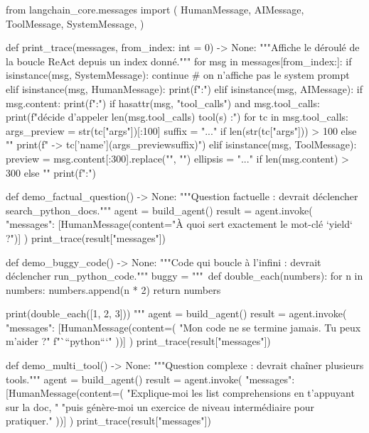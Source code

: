\documentclass[11pt,a4paper]{article}
\begin{document}
\begin{pythoncode}
from langchain_core.messages import (
    HumanMessage, AIMessage, ToolMessage, SystemMessage,
)


def print_trace(messages, from_index: int = 0) -> None:
    """Affiche le déroulé de la boucle ReAct depuis un index donné."""
    for msg in messages[from_index:]:
        if isinstance(msg, SystemMessage):
            continue   # on n'affiche pas le system prompt
        elif isinstance(msg, HumanMessage):
            print(f"\n[USER]:")
        elif isinstance(msg, AIMessage):
            if msg.content:
                print(f"\n[AI]:")
            if hasattr(msg, "tool_calls") and msg.tool_calls:
                print(f"\n[AI] décide d'appeler {len(msg.tool_calls)} tool(s) :")
                for tc in msg.tool_calls:
                    args_preview = str(tc["args"])[:100]
                    suffix = "..." if len(str(tc["args"])) > 100 else ""
                    print(f"   -> {tc['name']}({args_preview}{suffix})")
        elif isinstance(msg, ToolMessage):
            preview = msg.content[:300].replace("\n", "\n     ")
            ellipsis = "..." if len(msg.content) > 300 else ""
            print(f":")


def demo_factual_question() -> None:
    """Question factuelle : devrait déclencher search_python_docs."""
    agent = build_agent()
    result = agent.invoke({
        "messages": [HumanMessage(content="À quoi sert exactement le mot-clé `yield` ?")]
    })
    print_trace(result["messages"])


def demo_buggy_code() -> None:
    """Code qui boucle à l'infini : devrait déclencher run_python_code."""
    buggy = """\
def double_each(numbers):
    for n in numbers:
        numbers.append(n * 2)
    return numbers

print(double_each([1, 2, 3]))
"""
    agent = build_agent()
    result = agent.invoke({
        "messages": [HumanMessage(content=(
            "Mon code ne se termine jamais. Tu peux m'aider ?\n\n"
            f"```python\n{buggy}```"
        ))]
    })
    print_trace(result["messages"])


def demo_multi_tool() -> None:
    """Question complexe : devrait chaîner plusieurs tools."""
    agent = build_agent()
    result = agent.invoke({
        "messages": [HumanMessage(content=(
            "Explique-moi les list comprehensions en t'appuyant sur la doc, "
            "puis génère-moi un exercice de niveau intermédiaire pour pratiquer."
        ))]
    })
    print_trace(result["messages"])
\end{pythoncode}
\end{document}
